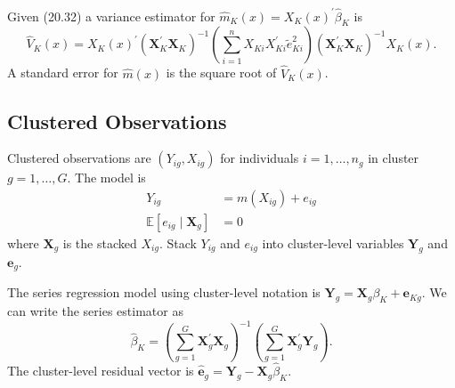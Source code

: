 \documentclass[10pt]{article}
\begin{document}
Given (20.32) a variance estimator for $\widehat{m}_{K}(x)=X_{K}(x)^{\prime} \widehat{\beta}_{K}$ is
$$
\widehat{V}_{K}(x)=X_{K}(x)^{\prime}\left(\boldsymbol{X}_{K}^{\prime} \boldsymbol{X}_{K}\right)^{-1}\left(\sum_{i=1}^{n} X_{K i} X_{K i}^{\prime} \widetilde{e}_{K i}^{2}\right)\left(\boldsymbol{X}_{K}^{\prime} \boldsymbol{X}_{K}\right)^{-1} X_{K}(x) .
$$
A standard error for $\widehat{m}(x)$ is the square root of $\widehat{V}_{K}(x)$.

\subsection{Clustered Observations}
Clustered observations are $\left(Y_{i g}, X_{i g}\right)$ for individuals $i=1, \ldots, n_{g}$ in cluster $g=1, \ldots, G$. The model is
$$
\begin{aligned}
Y_{i g} &=m\left(X_{i g}\right)+e_{i g} \\
\mathbb{E}\left[e_{i g} \mid \boldsymbol{X}_{g}\right] &=0
\end{aligned}
$$
where $\boldsymbol{X}_{g}$ is the stacked $X_{i g}$. Stack $Y_{i g}$ and $e_{i g}$ into cluster-level variables $\boldsymbol{Y}_{g}$ and $\boldsymbol{e}_{g}$.

The series regression model using cluster-level notation is $\boldsymbol{Y}_{g}=\boldsymbol{X}_{g} \beta_{K}+\boldsymbol{e}_{K g}$. We can write the series estimator as
$$
\widehat{\beta}_{K}=\left(\sum_{g=1}^{G} \boldsymbol{X}_{g}^{\prime} \boldsymbol{X}_{g}\right)^{-1}\left(\sum_{g=1}^{G} \boldsymbol{X}_{g}^{\prime} \boldsymbol{Y}_{g}\right) .
$$
The cluster-level residual vector is $\widehat{\boldsymbol{e}}_{g}=\boldsymbol{Y}_{g}-\boldsymbol{X}_{g} \widehat{\beta}_{K}$.
\end{document}
